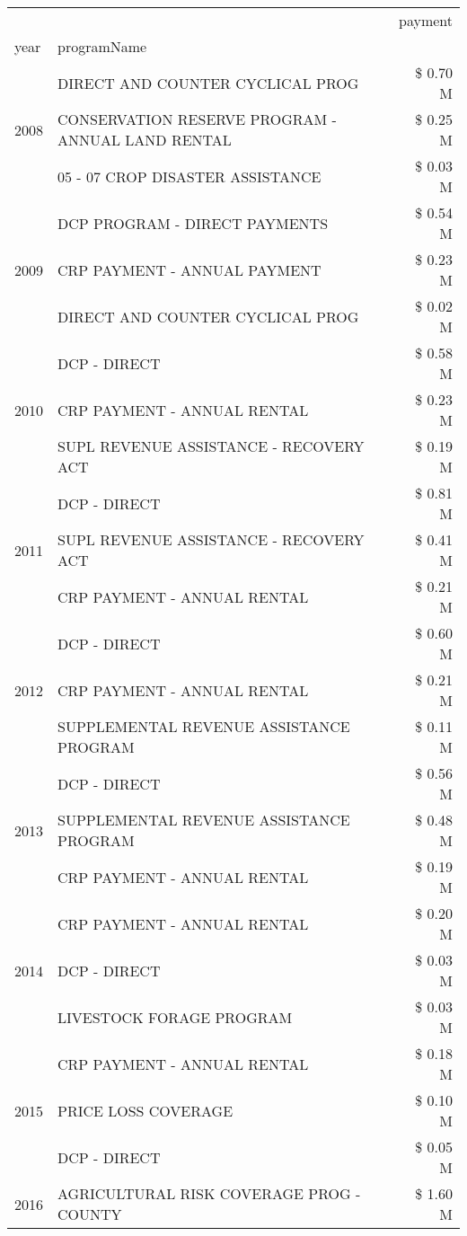 \begin{tabular}{llr}
\toprule
 &  & payment \\
year & programName &  \\
\midrule
\multirow[t]{3}{*}{2008} & DIRECT AND COUNTER CYCLICAL PROG & \$ 0.70 M \\
 & CONSERVATION RESERVE PROGRAM - ANNUAL LAND RENTAL & \$ 0.25 M \\
 & 05 - 07 CROP DISASTER ASSISTANCE & \$ 0.03 M \\
\cline{1-3}
\multirow[t]{3}{*}{2009} & DCP PROGRAM - DIRECT PAYMENTS & \$ 0.54 M \\
 & CRP PAYMENT - ANNUAL PAYMENT & \$ 0.23 M \\
 & DIRECT AND COUNTER CYCLICAL PROG & \$ 0.02 M \\
\cline{1-3}
\multirow[t]{3}{*}{2010} & DCP - DIRECT & \$ 0.58 M \\
 & CRP PAYMENT - ANNUAL RENTAL & \$ 0.23 M \\
 & SUPL REVENUE ASSISTANCE - RECOVERY ACT & \$ 0.19 M \\
\cline{1-3}
\multirow[t]{3}{*}{2011} & DCP - DIRECT & \$ 0.81 M \\
 & SUPL REVENUE ASSISTANCE - RECOVERY ACT & \$ 0.41 M \\
 & CRP PAYMENT - ANNUAL RENTAL & \$ 0.21 M \\
\cline{1-3}
\multirow[t]{3}{*}{2012} & DCP - DIRECT & \$ 0.60 M \\
 & CRP PAYMENT - ANNUAL RENTAL & \$ 0.21 M \\
 & SUPPLEMENTAL REVENUE ASSISTANCE PROGRAM & \$ 0.11 M \\
\cline{1-3}
\multirow[t]{3}{*}{2013} & DCP - DIRECT & \$ 0.56 M \\
 & SUPPLEMENTAL REVENUE ASSISTANCE PROGRAM & \$ 0.48 M \\
 & CRP PAYMENT - ANNUAL RENTAL & \$ 0.19 M \\
\cline{1-3}
\multirow[t]{3}{*}{2014} & CRP PAYMENT - ANNUAL RENTAL & \$ 0.20 M \\
 & DCP - DIRECT & \$ 0.03 M \\
 & LIVESTOCK FORAGE PROGRAM & \$ 0.03 M \\
\cline{1-3}
\multirow[t]{3}{*}{2015} & CRP PAYMENT - ANNUAL RENTAL & \$ 0.18 M \\
 & PRICE LOSS COVERAGE & \$ 0.10 M \\
 & DCP - DIRECT & \$ 0.05 M \\
\cline{1-3}
\multirow[t]{3}{*}{2016} & AGRICULTURAL RISK COVERAGE PROG - COUNTY & \$ 1.60 M \\

\end{tabular}
